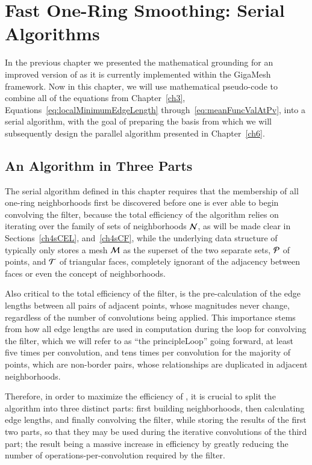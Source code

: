 \chapter{Fast One-Ring Smoothing: Serial Algorithms}
\label{ch4}
In the previous chapter we presented the mathematical grounding for an improved version of  as it is currently implemented within the GigaMesh framework. Now in this chapter, we will use mathematical pseudo-code to combine all of the equations from Chapter~\ref{ch3}, Equations~\ref{eq:localMinimumEdgeLength} through~\ref{eq:meanFuncValAtPv}, into a serial algorithm, with the goal of preparing the basis from which we will subsequently design the parallel algorithm presented in Chapter~\ref{ch6}.

%
%
\section{An Algorithm in Three Parts}
\label{ch4sATP}
The serial algorithm defined in this chapter requires that the membership of all one-ring neighborhoods first be discovered before one is ever able to begin convolving the filter, because the total efficiency of the algorithm relies on iterating over the family of sets of neighborhoods $\mathcal{N}$, as will be made clear in Sections~\ref{ch4sCEL}, and~\ref{ch4sCF}, while the underlying data structure of \tdd{} typically only stores a mesh $\mathcal{M}$ as the superset of the two separate sets, $\mathcal{P}$ of points, and $\mathcal{T}$ of triangular faces, completely ignorant of the adjacency between faces or even the concept of neighborhoods.

Also critical to the total efficiency of the filter, is the pre-calculation of the edge lengths between all pairs of adjacent points, whose magnitudes never change, regardless of the number of convolutions being applied. This importance stems from how all edge lengths are used in computation during the loop for convolving the filter, which we will refer to as ``the \gls{principleLoop}'' going forward, at least five times per convolution, and tens times per convolution for the majority of points, which are non-border pairs, whose relationships are duplicated in adjacent neighborhoods.

Therefore, in order to maximize the efficiency of , it is crucial to split the algorithm into three distinct parts: first building neighborhoods, then calculating edge lengths, and finally convolving the filter, while storing the results of the first two parts, so that they may be used during the iterative convolutions of the third part; the result being a massive increase in efficiency by greatly reducing the number of operations-per-convolution required by the filter.

